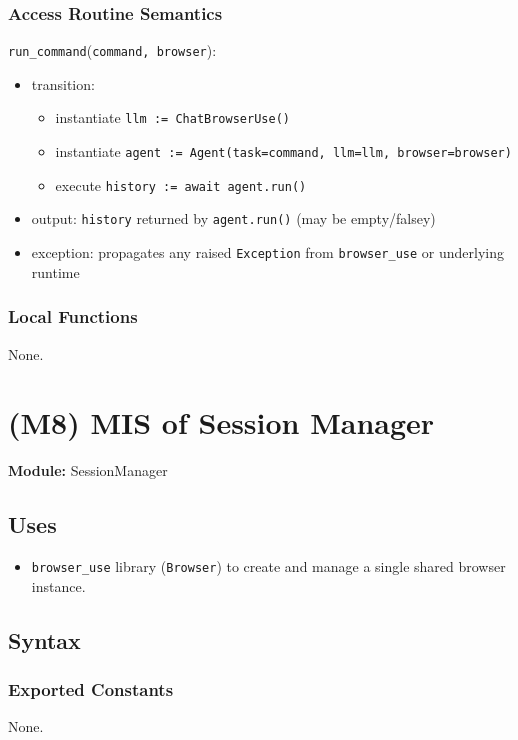 \documentclass[12pt, titlepage]{article}
\begin{document}
\subsubsection{Access Routine Semantics}

\noindent \texttt{run\_command}(\texttt{command, browser}):
\begin{itemize}
  \item transition:
    \begin{itemize}
      \item instantiate \texttt{llm := ChatBrowserUse()}
      \item instantiate \texttt{agent := Agent(task=command, llm=llm, browser=browser)}
      \item execute \texttt{history := await agent.run()}
    \end{itemize}
  \item output: \texttt{history} returned by \texttt{agent.run()} (may be empty/falsey)
  \item exception: propagates any raised \texttt{Exception} from \texttt{browser\_use} or underlying runtime
\end{itemize}

\subsubsection{Local Functions}
None.

\section{(M8) MIS of Session Manager}
\label{M8}
\textbf{Module:} SessionManager

\subsection{Uses}
\begin{itemize}
  \item \texttt{browser\_use} library (\texttt{Browser}) to create and manage a single shared browser instance.
\end{itemize}

\subsection{Syntax}

\subsubsection{Exported Constants}
None.
\end{document}
